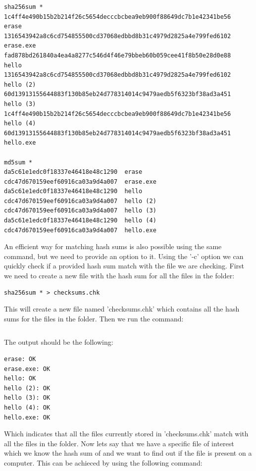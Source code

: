 \documentclass[a4paper,10pt,oneside]{article}
\begin{document}
\begin{lstlisting}[caption= Result of sha256 and md5sum]
sha256sum *
1c4ff4e490b15b2b214f26c5654decccbcbea9eb900f88649dc7b1e42341be56  erase
1316543942a8c6cd754855500cd37068edbbd8b31c4979d2825a4e799fed6102  erase.exe
fad878bd261840a4ea4a8277c546d4f46e79bbeb60b059cee41f8b50e28d0e88  hello
1316543942a8c6cd754855500cd37068edbbd8b31c4979d2825a4e799fed6102  hello (2)
60d13913155644883f130b85eb24d778314014c9479aedb5f6323bf38ad3a451  hello (3)
1c4ff4e490b15b2b214f26c5654decccbcbea9eb900f88649dc7b1e42341be56  hello (4)
60d13913155644883f130b85eb24d778314014c9479aedb5f6323bf38ad3a451  hello.exe

md5sum *
da5c61e1edc0f18337e46418e48c1290  erase
cdc47d670159eef60916ca03a9d4a007  erase.exe
da5c61e1edc0f18337e46418e48c1290  hello
cdc47d670159eef60916ca03a9d4a007  hello (2)
cdc47d670159eef60916ca03a9d4a007  hello (3)
da5c61e1edc0f18337e46418e48c1290  hello (4)
cdc47d670159eef60916ca03a9d4a007  hello.exe
\end{lstlisting}

An efficient way for matching hash sums is also possible using the same command, but we need to provide an option to it. Using the '-c' option
we can quickly check if a provided hash sum match with the file we are checking. First we need to create a new file with the hash sum for
all the files in the folder:

\begin{lstlisting}[caption= Save result in new file]
sha256sum * > checksums.chk
\end{lstlisting}

This will create a new file named 'checksums.chk' which contains all the hash sums for the files in the folder. Then we run the command:

\begin{lstlisting}[caption=Check if files il folder match with files in list]

\end{lstlisting}

The output should be the following:

\begin{lstlisting}[caption=Output from Example above]
erase: OK
erase.exe: OK
hello: OK
hello (2): OK
hello (3): OK
hello (4): OK
hello.exe: OK
\end{lstlisting}

Which indicates that all the files currently stored in 'checksums.chk' match with all the files in the folder.
Now lets say that we have a specific file of interest which we know the hash sum of and we want to find out if the file is present on a computer.
This can be achieced by using the following command:
\end{document}
